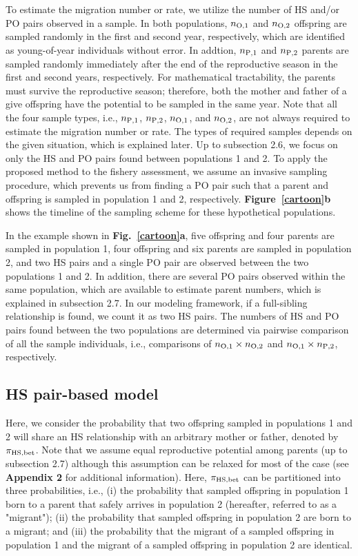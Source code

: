 \documentclass[12pt, English]{article}
\begin{document}
\begin{spacing}{1.9}
To estimate the migration number or rate, we utilize the number of HS and/or PO pairs observed in a sample. In both populations, $n_{\rm O, 1}$ and $n_{\rm O, 2}$ offspring are sampled randomly in the first and second year, respectively, which are identified as young-of-year individuals without error. In addtion, $n_{\rm P, 1}$ and $n_{\rm P, 2}$ parents are sampled randomly immediately after the end of the reproductive season in the first and second years, respectively. For mathematical tractability, the parents must survive the reproductive season; therefore, both the mother and father of a give offspring have the potential to be sampled in the same year. Note that all the four sample types, i.e., $n_{\rm P, 1}$, $n_{\rm P, 2}$, $n_{\rm O, 1}$, and $n_{\rm O, 2}$, are not always required to estimate the migration number or rate. The types of required samples depends on the given situation, which is explained later. Up to subsection 2.6, we focus on only the HS and PO pairs found between populations 1 and 2. To apply the proposed method to the fishery assessment, we assume an invasive sampling procedure, which prevents us from finding a PO pair such that a parent and offspring is sampled in population 1 and 2, respectively. {\bf Figure~\ref{cartoon}b} shows the timeline of the sampling scheme for these hypothetical populations. 

In the example shown in {\bf Fig.~\ref{cartoon}a}, five offspring and four parents are sampled in population 1, four offspring and six parents are sampled in population 2, and two HS pairs and a single PO pair are observed between the two populations 1 and 2. In addition, there are several PO pairs observed within the same population, which are available to estimate parent numbers, which is explained in subsection 2.7. In our modeling framework, if a full-sibling relationship is found, we count it as two HS pairs. The numbers of HS and PO pairs found between the two populations are determined via pairwise comparison of all the sample individuals, i.e., comparisons of $n_{\rm O,1}\times n_{\rm O,2}$ and $n_{\rm O,1}\times n_{\rm P,2}$, respectively. 

\subsection{HS pair-based model}

Here, we consider the probability that two offspring sampled in populations 1 and 2 will share an HS relationship with an arbitrary mother or father, denoted by $\pi_{\rm HS, bet}$. Note that we assume equal reproductive potential among parents (up to subsection 2.7) although this assumption can be relaxed for most of the case (see {\bf Appendix 2} for additional information). Here, $\pi_{\rm HS, bet}$ can be partitioned into three probabilities, i.e., (i) the probability that sampled offspring in population 1 born to a parent that safely arrives in population 2 (hereafter, referred to as a "migrant"); (ii) the probability that sampled offspring in population 2 are born to a migrant; and (iii) the probability that the migrant of a sampled offspring in population 1 and the migrant of a sampled offspring in population 2 are identical. 


\end{spacing}
\end{document}
